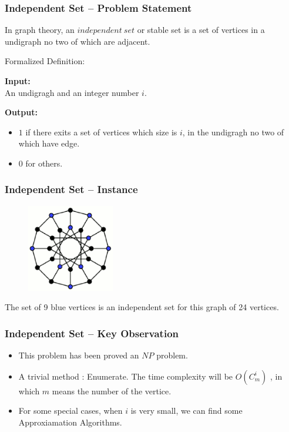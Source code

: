 \documentclass[slidestop,compress,mathserif]{beamer}
\begin{document}
\frame
{
\frametitle{Independent Set -- Problem Statement}
In graph theory, an $independent \ set$ or stable set is a set of vertices in a undigraph no two of which are adjacent. 
\begin{block}{Formalized Definition:}

 {\bf Input:}\\

 An undigragh and an integer number $i$.


 {\bf Output:}\\
\begin{itemize}
  \item $1$ if there exits a set of vertices which size is $i$, in the undigragh no two of which have edge.
  \item $0$ for others.
\end{itemize}



\end{block}
}

\frame
{
\frametitle{Independent Set -- Instance}

\begin{figure}
 \includegraphics[width=1.5in] {Independent_set_graph.eps}
\end{figure}

The set of 9 blue vertices is an independent set for this graph of 24 vertices.

}
\frame
{
\frametitle{Independent Set -- Key Observation}
\begin{itemize}
 \item This problem has been proved an $NP$ problem.
 \item A trivial method : Enumerate. The time complexity will be $O(C^i_m)$ , in which $m$ means the number of the vertice.
 \item For some special cases, when $i$ is very small, we can find some Approxiamation Algorithms.
\end{itemize}

}
\end{document}
